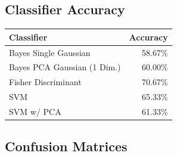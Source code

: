 \documentclass[a4paper]{article}
\begin{document}
\subsection{Classifier Accuracy}

\begin{tabular}{ | l | r | }
\hline
\textbf{Classifier} & \textbf{Accuracy} \\
\hline
Bayes Single Gaussian  &   58.67\% \\
\hline
Bayes PCA Gaussian (1 Dim.)  &   60.00\% \\
\hline
Fisher Discriminant  &   70.67\% \\
\hline
SVM          &   65.33\% \\
\hline
SVM w/ PCA & 61.33\% \\
\hline
\end{tabular}


\subsection{Confusion Matrices}
\end{document}
